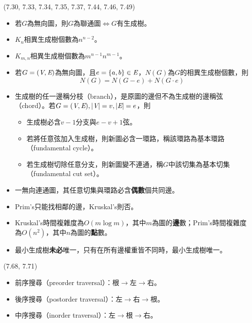 \item \begin{theorem}{(7.30, 7.33, 7.34, 7.35, 7.37, 7.44, 7.46, 7.49)} \quad\quad
    \begin{itemize}
        \item 若$G$為無向圖，則$G$為聯通圖$\iff$$G$有生成樹。
        \item $K_n$相異生成樹個數為$n^{n - 2}$。
        \item $K_{m, n}$相異生成樹個數為$m^{n - 1}n^{m - 1}$。
        \item 若$G = (\textit{V}, \textit{E})$為無向圖，且$e = \{a, b\} \in \textit{E}$，$N(G)$為$G$的相異生成樹個數，則\begin{equation}
            N(G) = N(G - e) + N(G \cdot e)
        \end{equation}
        \item 生成樹的任一邊稱分枝（branch），是原圖的邊但不為生成樹的邊稱弦（chord）。若$G = (\textit{V}, \textit{E}), |\textit{V}| = v, |\textit{E}| = e$，則\begin{itemize}
            \item 生成樹必含$v - 1$分支與$e - v + 1$弦。
            \item 若將任意弦加入生成樹，則新圖必含一環路，稱該環路為基本環路（fundamental cycle）。
            \item 若生成樹切除任意分支，則新圖變不連通，稱$G$中該切集為基本切集（fundamental cut set）。
        \end{itemize}
        \item 一無向連通圖，其任意切集與環路必含\textbf{偶數}個共同邊。
        \item Prim's只能找相鄰的邊，Kruskal's則否。
        \item Kruskal's時間複雜度為$O(m\log m)$，其中$m$為圖的\textbf{邊}數；Prim's時間複雜度為$O(n^2)$，其中$n$為圖的\textbf{點}數。
        \item 最小生成樹\textbf{未必}唯一，只有在所有邊權重皆不同時，最小生成樹唯一。
    \end{itemize}
\end{theorem}

\item \begin{theorem}{(7.68, 7.71)} \quad\quad
    \begin{itemize}
        \item 前序搜尋（preorder traversal）：根$\rightarrow$左$\rightarrow$右。
        \item 後序搜尋（postorder traversal）：左$\rightarrow$右$\rightarrow$根。
        \item 中序搜尋（inorder traversal）：左$\rightarrow$根$\rightarrow$右。
    \end{itemize}
\end{theorem}
